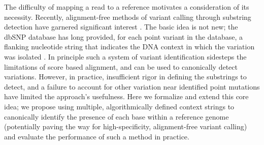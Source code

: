 The difficulty of mapping a read to a reference motivates a consideration of its necessity. Recently, alignment-free methods of variant calling through substring detection have garnered significant interest \citep{dilthey2015improved}. The basic idea is not new; the dbSNP database has long provided, for each point variant in the database, a flanking nucleotide string that indicates the DNA context in which the variation was isolated \citep{sherry2001dbsnp}. In principle such a system of variant identification sidesteps the limitations of score based alignment, and can be used to canonically detect variations. However, in practice, insufficient rigor in defining the substrings to detect, and a failure to account for other variation near identified point mutations have limited the approach's usefulness. Here we formalize and extend this core idea; we propose using multiple, algorithmically defined context strings to canonically identify the presence of each base within a reference genome (potentially paving the way for high-specificity, alignment-free variant calling) and evaluate the performance of such a method in practice. 









